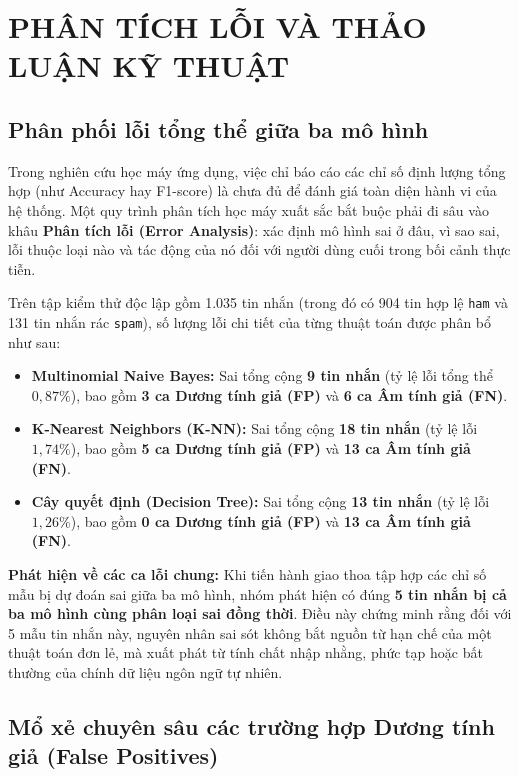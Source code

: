 \chapter{PHÂN TÍCH LỖI VÀ THẢO LUẬN KỸ THUẬT}
\label{chap:chuong5}

\section{Phân phối lỗi tổng thể giữa ba mô hình}
\label{sec:phan-phoi-loi}

Trong nghiên cứu học máy ứng dụng, việc chỉ báo cáo các chỉ số định lượng tổng hợp (như Accuracy hay F1-score) là chưa đủ để đánh giá toàn diện hành vi của hệ thống. Một quy trình phân tích học máy xuất sắc bắt buộc phải đi sâu vào khâu \textbf{Phân tích lỗi (Error Analysis)}: xác định mô hình sai ở đâu, vì sao sai, lỗi thuộc loại nào và tác động của nó đối với người dùng cuối trong bối cảnh thực tiễn.

Trên tập kiểm thử độc lập gồm 1.035 tin nhắn (trong đó có 904 tin hợp lệ \texttt{ham} và 131 tin nhắn rác \texttt{spam}), số lượng lỗi chi tiết của từng thuật toán được phân bổ như sau:
\begin{itemize}
    \item \textbf{Multinomial Naive Bayes:} Sai tổng cộng \textbf{9 tin nhắn} (tỷ lệ lỗi tổng thể $0,87\%$), bao gồm \textbf{3 ca Dương tính giả (FP)} và \textbf{6 ca Âm tính giả (FN)}.
    \item \textbf{K-Nearest Neighbors (K-NN):} Sai tổng cộng \textbf{18 tin nhắn} (tỷ lệ lỗi $1,74\%$), bao gồm \textbf{5 ca Dương tính giả (FP)} và \textbf{13 ca Âm tính giả (FN)}.
    \item \textbf{Cây quyết định (Decision Tree):} Sai tổng cộng \textbf{13 tin nhắn} (tỷ lệ lỗi $1,26\%$), bao gồm \textbf{0 ca Dương tính giả (FP)} và \textbf{13 ca Âm tính giả (FN)}.
\end{itemize}

\textbf{Phát hiện về các ca lỗi chung:}
Khi tiến hành giao thoa tập hợp các chỉ số mẫu bị dự đoán sai giữa ba mô hình, nhóm phát hiện có đúng \textbf{5 tin nhắn bị cả ba mô hình cùng phân loại sai đồng thời}. Điều này chứng minh rằng đối với 5 mẫu tin nhắn này, nguyên nhân sai sót không bắt nguồn từ hạn chế của một thuật toán đơn lẻ, mà xuất phát từ tính chất nhập nhằng, phức tạp hoặc bất thường của chính dữ liệu ngôn ngữ tự nhiên.

\section{Mổ xẻ chuyên sâu các trường hợp Dương tính giả (False Positives)}
\label{sec:false-positives}

